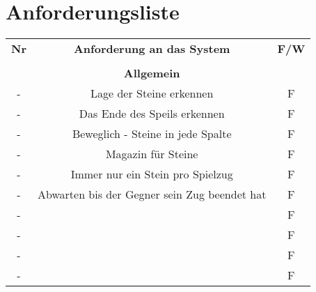 	\chapter*{Anforderungsliste}
	\begin{table}[hbt]
	\centering
	\label{Anforderungsliste}
	\begin{tabular}{ccc}
		\textbf{Nr} & \textbf{Anforderung an das System} & \textbf{F/W} \\
		\textbf{} & \textbf{}& \textbf{}  \\
		\hline
		\hline
		\textbf{} & \textbf{Allgemein}& \textbf{}  \\
		\hline
		\hline
		- & Lage der Steine erkennen & F\\
		\hline
		- & Das Ende des Speils erkennen & F\\
		\hline
		- & Beweglich - Steine in jede Spalte	& F\\
		\hline
		- &Magazin für Steine  & F\\
		\hline
		- & Immer nur ein Stein pro Spielzug & F\\
		\hline
		- &  Abwarten bis der Gegner sein Zug beendet hat& F\\
		\hline
			- &  & F\\
		\hline
			- &  & F\\
		\hline
			- &  & F\\
		\hline
			- &  & F\\
		\hline
		
	\end{tabular}
\end{table}